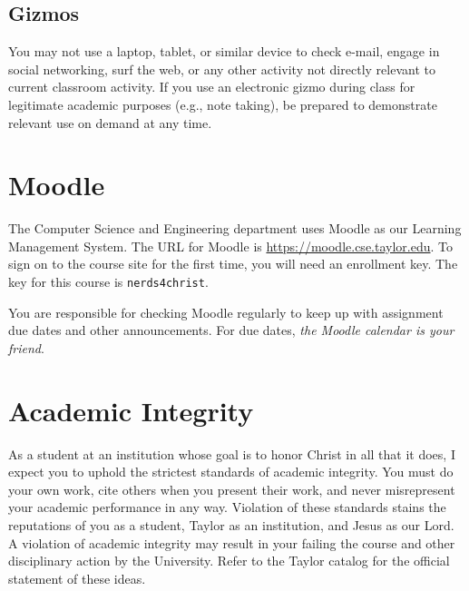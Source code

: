 \subsection{Gizmos}

You may not use a laptop, tablet, or similar device to check e-mail, engage in social
networking, surf the web, or any other activity not directly relevant
to current classroom activity.
If you use an electronic gizmo during class for legitimate academic purposes
(e.g., note taking), be prepared to demonstrate relevant use on demand
at any time.

\section{Moodle}

The Computer Science and Engineering department uses Moodle
as our Learning Management System.
The URL for Moodle is \url{https://moodle.cse.taylor.edu}.
To sign on to the course site for the first time,
you will need an enrollment key.
The key for this course is
\texttt{nerds4christ}.

You are responsible for checking Moodle regularly
to keep up with assignment due dates and other announcements.
For due dates, \emph{the Moodle calendar is your friend}.

\section{Academic Integrity}

As a student at an institution whose goal is to honor Christ in all that it does,
I expect you to uphold the strictest standards of academic integrity.
You must do your own work,
cite others when you present their work,
and never misrepresent your academic performance in any way.
Violation of these standards stains the reputations of you as a student,
Taylor as an institution,
and Jesus as our Lord.
A violation of academic integrity may result in your failing the course
and other disciplinary action by the University.
Refer to the Taylor catalog for the official statement of these ideas.

